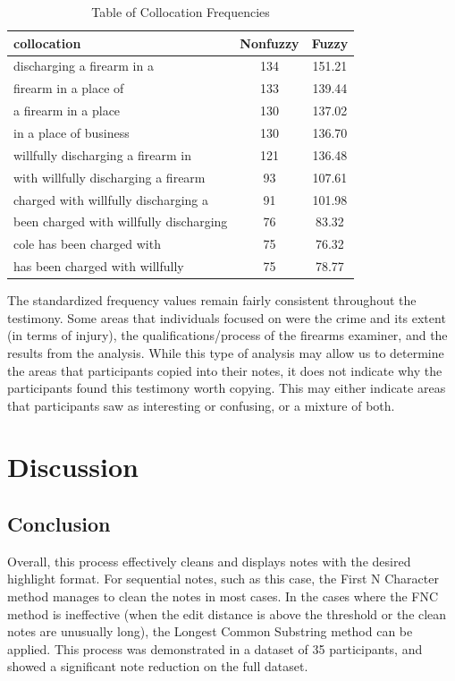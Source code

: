 \documentclass[print]{nuthesis}
\begin{document}
\begin{table}

\caption{\label{tab:nonfuzzycount}Table of Collocation Frequencies}
\centering
\begin{tabular}[t]{l|c|c}
\hline
collocation & Nonfuzzy & Fuzzy\\
\hline
discharging a firearm in a & 134 & 151.21\\
\hline
firearm in a place of & 133 & 139.44\\
\hline
a firearm in a place & 130 & 137.02\\
\hline
in a place of business & 130 & 136.70\\
\hline
willfully discharging a firearm in & 121 & 136.48\\
\hline
with willfully discharging a firearm & 93 & 107.61\\
\hline
charged with willfully discharging a & 91 & 101.98\\
\hline
been charged with willfully discharging & 76 & 83.32\\
\hline
cole has been charged with & 75 & 76.32\\
\hline
has been charged with willfully & 75 & 78.77\\
\hline
\end{tabular}
\end{table}

The standardized frequency values remain fairly consistent throughout the testimony.
Some areas that individuals focused on were the crime and its extent (in terms of injury), the qualifications/process of the firearms examiner, and the results from the analysis.
While this type of analysis may allow us to determine the areas that participants copied into their notes, it does not indicate why the participants found this testimony worth copying.
This may either indicate areas that participants saw as interesting or confusing, or a mixture of both.

\hypertarget{discussion-1}{%
\section{Discussion}\label{discussion-1}}

\hypertarget{conclusion-1}{%
\subsection{Conclusion}\label{conclusion-1}}

Overall, this process effectively cleans and displays notes with the desired highlight format.
For sequential notes, such as this case, the First N Character method manages to clean the notes in most cases.
In the cases where the FNC method is ineffective (when the edit distance is above the threshold or the clean notes are unusually long), the Longest Common Substring method can be applied.
This process was demonstrated in a dataset of 35 participants, and showed a significant note reduction on the full dataset.
\end{document}
